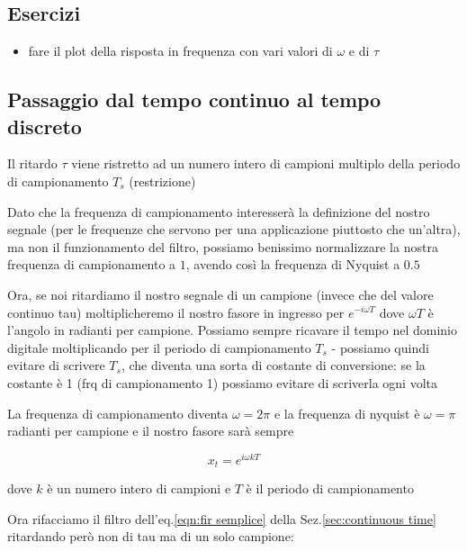 \subsection{Esercizi}

\begin{itemize}

	\item fare il plot della risposta in frequenza con vari valori di $\omega$ e
					di $\tau$

\end{itemize}


\subsection{Passaggio dal tempo continuo al tempo discreto}


	Il ritardo $\tau$ viene ristretto ad un numero intero di campioni multiplo della
		periodo di campionamento $T_s$ (restrizione)

	Dato che la frequenza di campionamento interesser\`a  la  definizione
    del  nostro  segnale  (per  le  frequenze  che   servono   per   una
    applicazione piuttosto che un'altra), ma non  il  funzionamento  del
    filtro, possiamo  benissimo  normalizzare  la  nostra  frequenza  di
    campionamento a $1$, avendo cos\`i la frequenza di Nyquist a $0.5$

	Ora, se noi ritardiamo il nostro segnale di un campione (invece che del
		valore continuo tau) moltiplicheremo il nostro fasore in ingresso per
		$e^{-i \omega T}$ dove $\omega T$ \`e l'angolo in radianti per campione. Possiamo sempre
		ricavare il tempo nel dominio digitale moltiplicando per il periodo di
		campionamento $T_s$ - possiamo quindi evitare di scrivere $T_s$, che diventa
		una sorta di costante di conversione: se la costante \`e 1 (frq di
		campionamento 1) possiamo evitare di scriverla ogni volta

	La frequenza di campionamento diventa $\omega = 2 \pi$ e la frequenza di nyquist \`e
		$\omega = \pi$ radianti per campione e il nostro fasore sar\`a sempre

		 \begin{equation}
	 			x_t = e^{i\omega kT}
		 \end{equation}
		
		dove $k$ \`e un numero intero di campioni e $T$ \`e il periodo di campionamento

		Ora rifacciamo il filtro dell'eq.\ref{eqn:fir semplice} della Sez.\vref{sec:continuous time} ritardando per\`o non di tau
	  ma di un solo campione:

